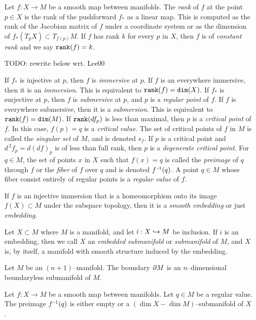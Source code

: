 \begin{defn}[Embedding]
	Let $f:X\to M$ be a smooth map between manifolds.
	The \emph{rank} of $f$ at the point $p\in X$ is the rank of the pushforward $f_*$ as a linear map.
	This is computed as the rank of the Jacobian matrix of $f$ under a coordinate system or as the dimension of $f_*(T_p X)\subset T_{f(p)} M$.
	If $f$ has rank $k$ for every $p$ in $X$, then $f$ is of \emph{constant rank} and we say $\texttt{rank}(f)=k$.
	
	TODO: rewrite below wrt. Lee00 \cite{Lee00}
	
	If $f_*$ is injective at $p$, then $f$ is \emph{immersive} at $p$.
	If $f$ is an everywhere immersive, then it is an \emph{immersion}.
	This is equivalent to $\texttt{rank}(f)=\texttt{dim}(X)$.
	If $f_*$ is surjective at $p$, then $f$ is \emph{submersive} at $p$, and $p$ is a \emph{regular point} of $f$.
	If $f$ is everywhere submersive, then it is a \emph{submersion}.
	This is equivalent to $\texttt{rank}(f)=\texttt{dim}(M)$.
	If $\texttt{rank}(df_p)$ is less than maximal, then $p$ is a \emph{critical point} of $f$.
	In this case, $f(p)=q$ is a \emph{critical value}.
	The set of critical points of $f$ in $M$ is called the \emph{singular set} of $M$, and is denoted $s_f$.
	If $p$ is a critical point and $d^{\,2}\!f_p = d(df)_p$ is of less than full rank, then $p$ is a \emph{degenerate critical point}.
	For $q\in M$, the set of points $x$ in $X$ such that $f(x)=q$ is called the \emph{preimage} of $q$ through $f$ or the \emph{fiber} of $f$ over $q$ and is denoted $f^{\,\text{-}1}(q)$.
	A point $q \in M$ whose fiber consist entirely of regular points is a \emph{regular value} of $f$.
	
	If $f$ is an injective immersion that is a homeomorphism onto its image $f(X)\subset M$ under the subspace topology, then it is a \emph{smooth embedding} or just \emph{embedding}.
	
	Let $X\subset M$ where $M$ is a manifold, and let $i:X\hookrightarrow M$ be inclusion.
	If $i$ is an embedding, then we call $X$ an \emph{embedded submanifold} or \emph{submanifold} of $M$, and $X$ is, by itself, a manifold with smooth structure induced by the embedding.
\end{defn}

\begin{prop}
	\label{prop:boundariesaremanifolds}
	Let $M$ be an $(n+1)$--manifold.
	The boundary $\partial M$ is an $n$--dimensional boundaryless submanifold of $M$.
\end{prop}

\begin{theorem}
	Let $f:X\to M$ be a smooth map between manifolds.
	Let $q\in M$ be a regular value.
	The preimage $f^{\,\text{-}1}(q)$ is either empty or a $(\dim X-\dim M)$--submanifold of $X$.
\end{theorem}

